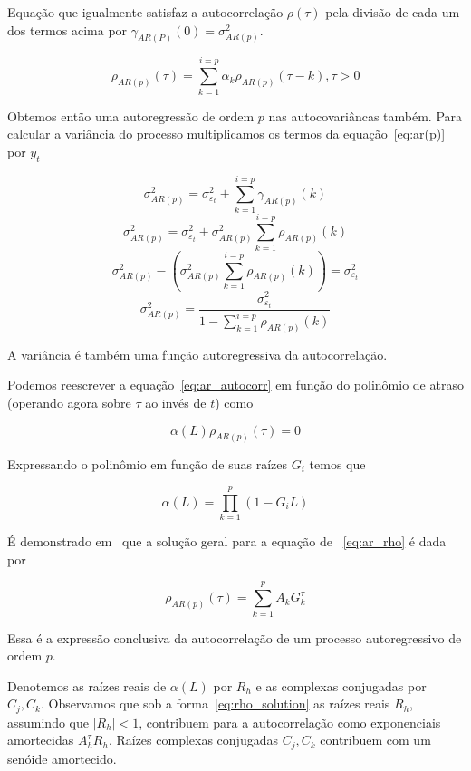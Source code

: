 Equação que igualmente satisfaz a autocorrelação $\rho(\tau)$ pela divisão de
cada um dos termos acima por $\gamma_{AR(P)}(0) = \sigma_{AR(p)}^2$.

\begin{equation}\label{eq:ar_autocorr}
    \rho_{AR(p)}(\tau) = \sum^{i=p}_{k=1} \alpha_k \rho_{AR(p)}(\tau - k), \tau > 0
\end{equation}

Obtemos então uma autoregressão de ordem $p$ nas autocovariâncas também. Para
calcular a variância do processo multiplicamos os termos da equação~\ref{eq:ar(p)}
por $y_{t}$

$$ \sigma_{AR(p)}^2 = \sigma_{\varepsilon_t}^2 + \sum^{i=p}_{k=1} \gamma_{AR(p)}(k)$$
$$ \sigma_{AR(p)}^2 = \sigma_{\varepsilon_t}^2 + \sigma_{AR(p)}^2\sum^{i=p}_{k=1} \rho_{AR(p)}(k)$$
$$ \sigma_{AR(p)}^2 - \left(\sigma_{AR(p)}^2\sum^{i=p}_{k=1} \rho_{AR(p)}(k)\right) = \sigma_{\varepsilon_t}^2 $$
$$ \sigma_{AR(p)}^2 = \frac{\sigma_{\varepsilon_t}^2}{1 - \sum^{i=p}_{k=1} \rho_{AR(p)}(k)}$$

A variância é também uma função autoregressiva da autocorrelação.

Podemos reescrever a equação~\ref{eq:ar_autocorr} em função do polinômio de
atraso (operando agora sobre $\tau$ ao invés de $t$) como

\begin{equation}\label{eq:ar_rho}
    \alpha(L)\rho_{AR(p)}(\tau) = 0
\end{equation}


Expressando o polinômio em função de suas raízes $G_i$ temos que

$$\alpha(L) = \prod_{k=1}^{p} (1 - G_i L)$$

É demonstrado em~\cite[capítulo~4]{box} que a solução geral para a equação de
~\ref{eq:ar_rho} é dada por

\begin{equation}\label{eq:rho_solution}
    \rho_{AR(p)}(\tau) = \sum_{k=1}^{p} A_k G^{\tau}_k
\end{equation}

Essa é a expressão conclusiva da autocorrelação de um processo autoregressivo
de ordem $p$.

Denotemos as raízes reais de $\alpha(L)$ por $R_h$ e as complexas conjugadas
por $C_j, C_k$. Observamos que sob a forma~\ref{eq:rho_solution} as raízes
reais $R_h$, assumindo que $|R_h| < 1$, contribuem para a autocorrelação como
exponenciais amortecidas $A_h^{\tau} R_h$. Raízes complexas conjugadas $C_j,
C_k$ contribuem com um senóide amortecido.

